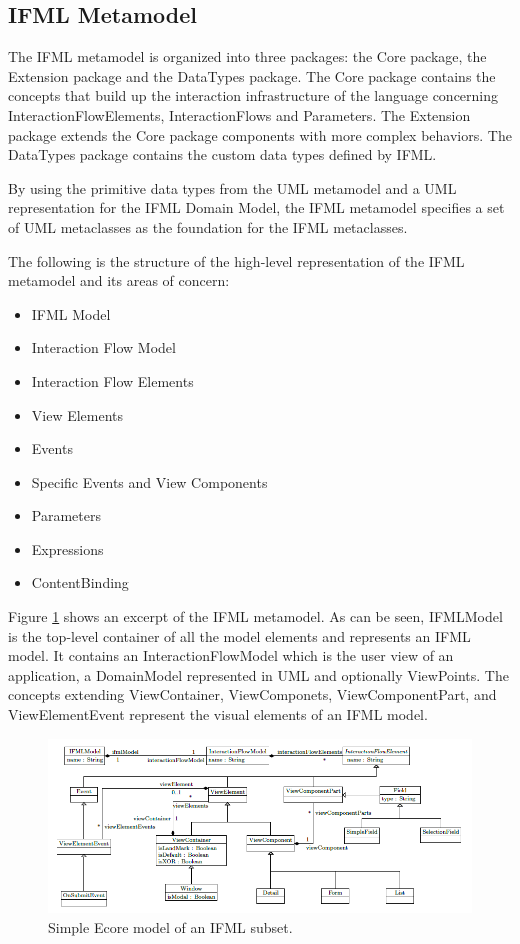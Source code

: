 \subsection{IFML Metamodel}

The IFML metamodel is organized into three packages: the Core package, the Extension package and the DataTypes package. The Core package contains the concepts that build up the interaction infrastructure of the language concerning InteractionFlowElements, InteractionFlows and Parameters. The Extension package extends the Core package components with more complex behaviors. The DataTypes package contains the custom data types defined by IFML.

By using the primitive data types from the UML metamodel and a UML representation for the IFML Domain Model, the IFML metamodel specifies a set of UML metaclasses as the foundation for the IFML metaclasses.

The following is the structure of the high-level representation of the IFML metamodel and its areas of concern:

\begin{itemize}
  \item IFML Model
  \item Interaction Flow Model
  \item Interaction Flow Elements
  \item View Elements
  \item Events
  \item Specific Events and View Components
  \item Parameters
  \item Expressions
  \item ContentBinding
\end{itemize}

Figure \ref{fig:simple-ifml-core-model} shows an excerpt of the IFML metamodel. As can be seen, IFMLModel is the top-level container of all the model elements and represents an IFML model. It contains an InteractionFlowModel which is the user view of an application, a DomainModel represented in UML and optionally ViewPoints. The concepts extending ViewContainer, ViewComponets, ViewComponentPart, and ViewElementEvent represent the visual elements of an IFML model.

\vspace{0.5cm}
\begin{figure}[H]
  \centering
    \includegraphics[width=12cm]{images/diagrams/ifml-metamodel.png}
  \caption{Simple Ecore model of an IFML subset.}
  \label{fig:simple-ifml-core-model}
\end{figure}
\vspace{0.5cm}

